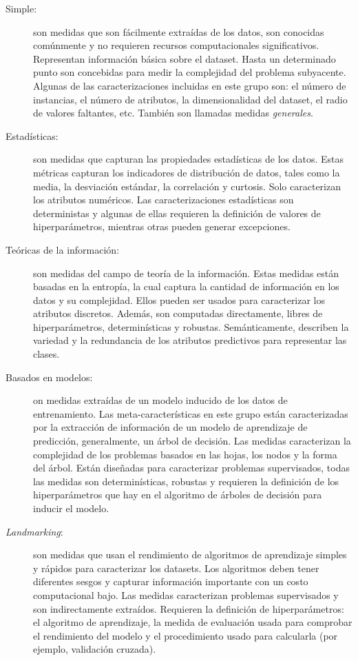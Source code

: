 \begin{description}
	\item[Simple:] son medidas que son fácilmente extraídas de los datos, son conocidas comúnmente y no requieren recursos computacionales significativos. Representan información básica sobre el dataset. Hasta un determinado punto son concebidas para medir la complejidad del problema subyacente. Algunas de las caracterizaciones incluidas en este grupo son: el número de instancias, el número de atributos, la dimensionalidad del dataset, el radio de valores faltantes, etc. También son llamadas medidas \textit{generales}.
	\item[Estadísticas:] son medidas que capturan las propiedades estadísticas de los datos. Estas métricas capturan los indicadores de distribución de datos, tales como la media, la desviación estándar, la correlación y curtosis. Solo caracterizan los atributos numéricos. Las caracterizaciones estadísticas son deterministas y algunas de ellas requieren la definición de valores de hiperparámetros, mientras otras pueden generar excepciones.
	\item[Teóricas de la información:] son medidas del campo de teoría de la información. Estas medidas están basadas en la entropía, la cual captura la cantidad de información en los datos y su complejidad. Ellos pueden ser usados para caracterizar los atributos discretos. Además, son computadas directamente, libres de hiperparámetros, determinísticas y robustas. Semánticamente, describen la variedad y la redundancia de los atributos predictivos para representar las clases.
	\item[Basados en modelos:] on medidas extraídas de un modelo inducido de los datos de entrenamiento. Las meta-características en este grupo están caracterizadas por la extracción de información de un modelo de aprendizaje de predicción, generalmente, un árbol de decisión. Las medidas caracterizan la complejidad de los problemas basados en las hojas, los nodos y la forma del árbol. Están diseñadas para caracterizar problemas supervisados, todas las medidas son determinísticas, robustas y requieren la definición de los hiperparámetros que hay en el algoritmo de árboles de decisión para inducir el modelo.
	\item[\textit{Landmarking}:] son medidas que usan el rendimiento de algoritmos de aprendizaje simples y rápidos para caracterizar los datasets. Los algoritmos deben tener diferentes sesgos y capturar información importante con un costo computacional bajo. Las medidas caracterizan problemas supervisados y son indirectamente extraídos. Requieren la definición de hiperparámetros: el algoritmo de aprendizaje, la medida de evaluación usada para comprobar el rendimiento del modelo y el procedimiento usado para calcularla (por ejemplo, validación cruzada).
\end{description}

